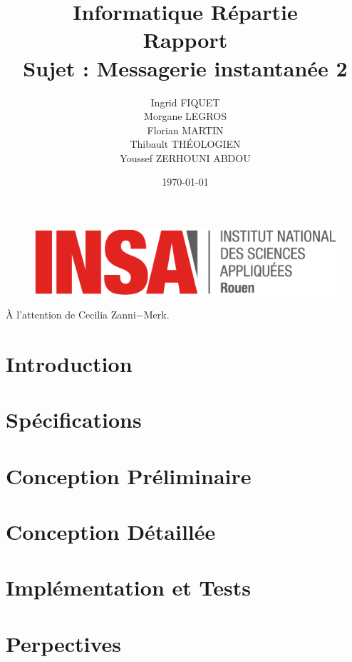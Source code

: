 \documentclass[a4paper,12pt]{article}
\title{\huge Informatique Répartie\\Rapport\\Sujet : Messagerie instantanée 2}
\author{Ingrid FIQUET\\Morgane LEGROS\\Florian MARTIN\\Thibault THÉOLOGIEN\\Youssef ZERHOUNI ABDOU}
\date{\today}
\begin{document}
	\begin{titlepage}
		\vfill
		\begin{figure}
			\includegraphics[scale=0.3]{img/logoINSARouen.png}
		\end{figure}

		\maketitle
		
		     
    \begin{center} 
    \LARGE
      \addvspace{10mm} 
      À l'attention de Cecilia Zanni$-$Merk. 
    \end{center} 

		\vfill
		\noindent \hrulefill

	\end{titlepage}



\newpage
\tableofcontents{}

\newpage
\part{Introduction}
	

\newpage
\part{Spécifications}
	
	
\newpage
\part{Conception Préliminaire}
	
	
\newpage
\part{Conception Détaillée}
	

\newpage
\part{Implémentation et Tests}
	
	
\newpage
\part{Perpectives}
	
\end{document}
